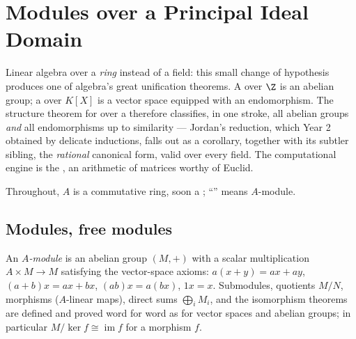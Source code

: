 \chapter{Modules over a Principal Ideal Domain}\label{ch:b3:modules}

Linear algebra over a \emph{ring} instead of a field: this small
change of hypothesis produces one of algebra's great unification
theorems. A  over $\Z$ is an abelian group; a  over
$K[X]$ is a vector space equipped with an endomorphism. The
structure theorem for  over a 
therefore classifies, in one stroke, all 
abelian groups \emph{and} all endomorphisms up to similarity ---
Jordan's reduction, which Year 2 obtained by delicate inductions,
falls out as a corollary, together with its subtler sibling, the
\emph{rational} canonical form, valid over every field. The
computational engine is the , an arithmetic of
matrices worthy of Euclid.

Throughout, $A$ is a commutative ring, soon a ; ``''
means $A$-module.

\section{Modules, free modules}

\begin{definition}\label{def:b3:modules:module}
An \emph{$A$-module} is an abelian group $(M, +)$
with a scalar multiplication $A \times M \to M$ satisfying the
vector-space axioms: $a(x + y) = ax + ay$, $(a + b)x = ax + bx$,
$(ab)x = a(bx)$, $1x = x$. Submodules, quotients $M/N$, morphisms
($A$-linear maps), direct sums $\bigoplus_i M_i$, and the
isomorphism theorems are defined and proved word for word as for
vector spaces and abelian groups; in particular $M/\ker f \cong
\operatorname{im} f$ for a morphism $f$.
\end{definition}

